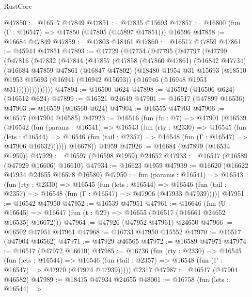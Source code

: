 \begin{lexlean}{RustCore}
\begin{coremodule}
@47850 := @16517 @47849
@47851 := @47835 @15693
@47857 := @16800 (fun (Γ : @16547) => @47850 (@47805 (@45897 @47851))) @16596
@47858 := @16684 @47849
@47859 := @47803 @18461
@47860 := @16517 @47859
@47861 := @45944 @47851
@47893 := @47729
    (@47754
      (@47795
        (@47797
          (@47799
            (@47816
              (@47832
                (@47844
                  (@47857
                    (@47858
                      (@47860 @47861)
                      (@16842 @47734)
                      (@16684
                        @47859
                        @47861
                        (@16847 @47802)
                        (@18480
                          @1954
                          @31
                          @15693
                          (@18510
                            @1953
                            @15693
                            (@16941 (@16942 @15693))
                            (@16946 (@16948 @1953 @31))))))))))))))
@47894 := @16500 @624
@47898 := @16502 (@16506 @624) (@16512 @624)
@47899 := @16521 @24649
@47901 := @16517 (@47899 @16536)
@47903 := @16559 (@16560 @624)
@47904 := @16555 @47903
@47906 := @16517 (@47904 @16585)
@47923 := @16516
    (fun (fn : @7) =>
    @47901
      (@16539
        (@16542
          (fun (params : @16541) =>
          @16543
            (fun (rty : @2330) =>
            @16545
              (fun (lets : @16544) =>
              @16546 (fun (tail : @2357) => @16548 (fun (Γ : @16547) => @47906 @16632))))))
        @16678))
    @1959
@47926 := @16684 (@47899 (@16534 @1959))
@47929 := @16597 (@16598 @1959) @24652
@47933 := @16517 (@16589 (@47929 @16606) @16610)
@47934 := @16623 @1959
@47939 := @16620 (@16622 @47934 @24655 @16578 @16580)
@47950 := fun (params : @16541) =>
  @16543
    (fun (rty : @2330) =>
    @16545
      (fun (lets : @16544) =>
      @16546 (fun (tail : @2357) => @16548 (fun (Γ : @16547) => @47906 (@47933 @47939)))))
@47951 := @16542 @47950
@47952 := @16539 @47951
@47961 := @16646
    (fun (U : @16645) => @16647 (fun (t : @29) => @16655 (@16517 (@16661 @24652 @16535) @16672)))
@47964 := @47926 (@47952 @47961) @24650
@47966 := @16502 @47951 @47961
@47968 := @16733 @47950 @15552
@47970 := @16517 (@47904 @46562)
@47971 := @47929 @46565
@47972 := @16589 @47971
@47974 := @16517 (@47972 @16610)
@47985 := @16736
    (fun (rty : @2330) =>
    @16545
      (fun (lets : @16544) =>
      @16546 (fun (tail : @2357) => @16548 (fun (Γ : @16547) => @47970 (@47974 @47939)))))
    @2317
@47987 := @16517 (@47904 @46582)
@47989 := @18415 @47934 @24655
@48001 := @16758
    (fun (lets : @16544) =>

\end{coremodule}
\end{lexlean}

